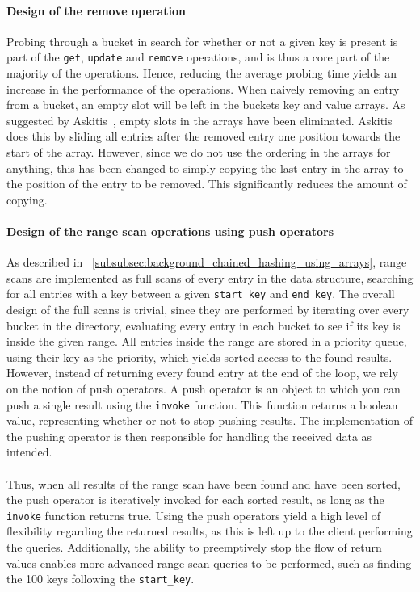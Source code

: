 \documentclass[11pt]{article} %
\begin{document}
\paragraph{Design of the remove operation}
Probing through a bucket in search for whether or not a given key is present is part of the \verb|get|, \verb|update| and \verb|remove| operations, and is thus a core part of the majority of the operations. Hence, reducing the average probing time yields an increase in the performance of the operations. When naively removing an entry from a bucket, an empty slot will be left in the buckets key and value arrays. As suggested by Askitis~\cite{NA09}, empty slots in the arrays have been eliminated. Askitis does this by sliding all entries after the removed entry one position towards the start of the array. However, since we do not use the ordering in the arrays for anything, this has been changed to simply copying the last entry in the array to the position of the entry to be removed. This significantly reduces the amount of copying.

\paragraph{Design of the range scan operations using push operators}
As described in ~\ref{subsubsec:background_chained_hashing_using_arrays}, range scans are implemented as full scans of every entry in the data structure, searching for all entries with a key between a given \verb|start_key| and \verb|end_key|. The overall design of the full scans is trivial, since they are performed by iterating over every bucket in the directory, evaluating every entry in each bucket to see if its key is inside the given range. All entries inside the range are stored in a priority queue, using their key as the priority, which yields sorted access to the found results. \\
However, instead of returning every found entry at the end of the loop, we rely on the notion of push operators. A push operator is an object to which you can push a single result using the \verb|invoke| function. This function returns a boolean value, representing whether or not to stop pushing results. The implementation of the pushing operator is then responsible for handling the received data as intended. \\
\\
Thus, when all results of the range scan have been found and have been sorted, the push operator is iteratively invoked for each sorted result, as long as the \verb|invoke| function returns true. Using the push operators yield a high level of flexibility regarding the returned results, as this is left up to the client performing the queries. Additionally, the ability to preemptively stop the flow of return values enables more advanced range scan queries to be performed, such as finding the 100 keys following the \verb|start_key|. 
\end{document}
